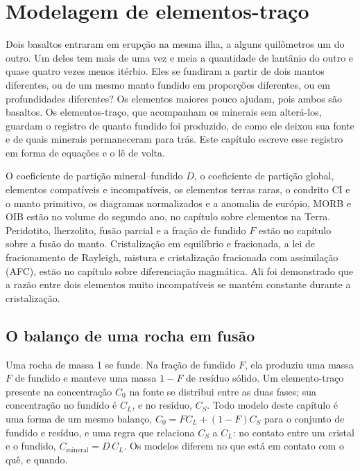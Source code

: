 \chapter{Modelagem de elementos-traço}\label{ch:b3:trace-element-modelling}

Dois basaltos entraram em erupção na mesma ilha, a alguns quilômetros um do outro. Um deles
tem mais de uma vez e meia a quantidade de lantânio do outro e quase quatro vezes menos itérbio.
Eles se fundiram a partir de dois mantos diferentes, ou de um mesmo manto fundido em proporções diferentes,
ou em profundidades diferentes? Os elementos maiores pouco ajudam, pois ambos são basaltos.
Os elementos-traço, que acompanham os minerais sem alterá-los, guardam o registro de quanto fundido foi produzido,
de como ele deixou sua fonte e de quais minerais permaneceram para trás.
Este capítulo escreve esse registro em forma de equações
e o lê de volta.

\begin{recall}
O coeficiente de partição mineral–fundido $D$, o coeficiente de partição global, elementos
compatíveis e incompatíveis, os elementos terras raras, o condrito CI e o manto primitivo, os diagramas normalizados e
a anomalia de európio, MORB e OIB estão no volume do segundo ano, no capítulo sobre elementos na Terra.
Peridotito, lherzolito, fusão parcial e a fração de fundido $F$ estão no capítulo sobre a fusão do manto.
Cristalização em equilíbrio e fracionada, a lei de fracionamento
de Rayleigh, mistura e cristalização fracionada com assimilação (AFC), estão no capítulo sobre
diferenciação magmática. Ali foi demonstrado que a razão entre dois elementos
muito incompatíveis se mantém
constante durante a
cristalização.
\end{recall}

\section{O balanço de uma rocha em fusão}\label{sec:b3:trace-element-modelling:balance}

Uma rocha de massa 1 se funde. Na fração de fundido $F$, ela produziu uma massa $F$ de fundido
e manteve uma massa $1 - F$ de resíduo sólido. Um elemento-traço presente na concentração $C_0$ na fonte
se distribui entre as duas fases; sua concentração no fundido é $C_L$,
e no resíduo, $C_S$. Todo modelo deste capítulo é uma forma de um mesmo balanço,
$C_0 = FC_L + (1 - F)C_S$ para o conjunto de fundido e resíduo,
e uma regra que relaciona $C_S$ a $C_L$: no contato entre um cristal e
o fundido, $C_{\text{mineral}} = D\,C_L$. Os modelos diferem no que está em contato com o quê,
e quando.

